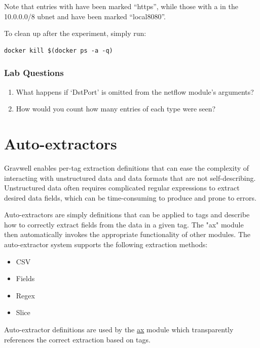 Note that entries with  have been marked ``https'',
while those with a  in the 10.0.0.0/8 ubnet and 
have been marked ``local8080''.

To clean up after the experiment, simply run:

\begin{Verbatim}[breaklines=true]
docker kill $(docker ps -a -q)
\end{Verbatim}

\subsubsection{Lab Questions}

\begin{enumerate}
\item
  What happens if `DstPort' is omitted from the netflow module's
  arguments?
\item
  How would you count how many entries of each type were seen?
\end{enumerate}



\section{Auto-extractors}

Gravwell enables per-tag extraction definitions that can ease the
complexity of interacting with unstructured data and data formats that
are not self-describing. Unstructured data often requires complicated
regular expressions to extract desired data fields, which can be
time-consuming to produce and prone to errors.

Auto-extractors are simply definitions that can be applied to tags and
describe how to correctly extract fields from the data in a given tag.
The "ax" module then automatically invokes the appropriate functionality
of other modules. The auto-extractor system supports the following
extraction methods:

\begin{itemize}
\tightlist
\item
  CSV
\item
  Fields
\item
  Regex
\item
  Slice
\end{itemize}

Auto-extractor definitions are used by
the \href{https://docs.gravwell.io/\#!search/ax/ax.md}{ax} module
which transparently references the correct extraction based on tags.

